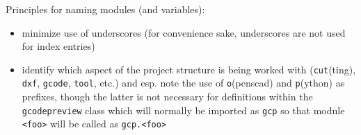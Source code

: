\documentclass{ltxdoc}
\begin{document}

%
%
%
%
%
%
%
%
%
%
%
%
%
%
%
%
%
%
%

Principles for naming modules (and variables):

\begin{itemize}
\item minimize use of underscores (for convenience sake, underscores are not used for index entries)
\item identify which aspect of the project structure is being worked with (\texttt{cut}(ting), 
      \texttt{dxf}, \texttt{gcode}, \texttt{tool}, etc.) and esp. note the use of
      \texttt{o}(penscad) and \texttt{p}(ython) as prefixes, though the latter is 
      not necessary for definitions within the \verb|gcodepreview| class which will 
      normally be imported as \verb|gcp| so that module \verb|<foo>| will be called as
      \verb|gcp.<foo>|
\end{itemize}
\end{document}
